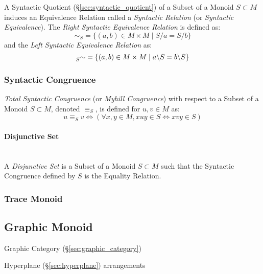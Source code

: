 A Syntactic Quotient (\S\ref{sec:syntactic_quotient}) of a Subset of a
Monoid $S \subset M$ induces an Equivalence Relation called a
\emph{Syntactic Relation} (or \emph{Syntactic Equivalence}). The
\emph{Right Syntactic Equivalence Relation} is defined as:
\[
  \sim_S = \{ (a,b) \in M \times M \;|\; S/a = S/b\}
\]
and the \emph{Left Syntactic Equivalence Relation} as:
\[
  \prescript{}{S}{\sim} = \{ (a,b) \in M \times M \;|\;
  a \backslash S = b \backslash S \}
\]



\subsubsection{Syntactic Congruence}\label{sec:syntactic_congruence}

\emph{Total Syntactic Congruence} (or \emph{Myhill Congruence}) with
respect to a Subset of a Monoid $S \subset M$, denoted $\equiv_S$, is
defined for $u,v \in M$ as:
\[
  u \equiv_S v \Leftrightarrow
  (\forall x,y \in M, xuy \in S \Leftrightarrow xvy \in S)
\]



\paragraph{Disjunctive Set}\label{sec:disjunctive_set}\hfill \\

A \emph{Disjunctive Set} is a Subset of a Monoid $S \subset M$ such
that the Syntactic Congruence defined by $S$ is the Equality Relation.



\subsubsection{Trace Monoid}\label{sec:trace_monoid}



\subsection{Graphic Monoid}\label{sec:graphic_monoid}


Graphic Category (\S\ref{sec:graphic_category})

Hyperplane (\S\ref{sec:hyperplane}) arrangements



